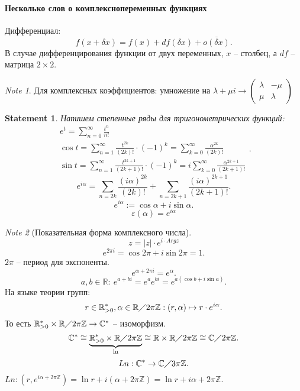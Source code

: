 \documentclass[11pt]{book}
\newcommand{\Z}{\mathbb{Z}}
\newcommand{\R}{\mathbb{R}}
\newcommand{\Cm}{\mathbb{C}}
\newcommand{\slim}{\sum\limits}
\theoremstyle{definition}
\theoremstyle{plain}
\theoremstyle{plain}
\newtheorem*{st}{Statement}
\theoremstyle{definition}
\theoremstyle{remark}
\newtheorem*{note}{Note}
\begin{document}
\paragraph{Несколько слов о комплекснопеременных функциях}
\begin{defn}
    Дифференциал: \[
	f(x + \delta  x) = f(x) + df( \delta  x) + \overline{o( \delta  x)}
    .\] 
    В случае дифференцирования функции от двух переменных, $x$ -- столбец, а $df$ -- матрица $2 \times 2$.
\end{defn}
\begin{note}
    Для комплексных коэффициентов:
    умножение на $\lambda + \mu i \to  
    \left (
    \begin{array}{cc}
	\lambda & - \mu \\
	\mu & \lambda
    \end{array}
\right )
    $ 
\end{note}
\begin{st}
    Напишем степенные ряды для тригонометрических функций:
    \[
	\begin{array}{l}
	    e^{t} = \slim_{n=0}^{\infty} \frac{t ^{n}}{n!}\\
	    \cos t = \slim_{n=1}^{ \infty} \frac{t ^{2k}}{(2k)!} \cdot (-1)^{k} = \slim_{k=0}^{\infty} \frac{ \alpha ^{2k}}{(2k)!}\\
	    \sin t = \slim_{n=1}^{ \infty} \frac{t ^{2k+1}}{(2k+1)!} \cdot (-1)^{k} = i\slim_{k=0}^{\infty} \frac{ \alpha ^{2k+1}}{(2k+1)!}
    \end{array} 
    .\] 
    \[
	e ^{i \alpha} = \slim_{n= 2k} \frac{(i\alpha)^{2k}}{(2k)!} + \slim_{n= 2k+1}\frac{(i \alpha )^{2k+1}}{(2k+1)!} %
    .\] 
    \[
    e ^{i \alpha} := \cos \alpha + i \sin \alpha 
    .\] 
    $$ \varepsilon  ( \alpha ) = e ^{i \alpha }$$
\end{st}
\begin{note}[Показательная форма комплексного числа]
    $$z = |z| \cdot e ^{i \cdot Arg z}$$
    \[
    e^{2\pi i} = \cos 2\pi + i \sin 2\pi = 1
    .\] 
    $2
    \pi$ -- период для экспоненты.
    \[
    e ^{\alpha + 2\pi i} = e^{ \alpha }
    .\] 
    \[
	a, b \in  \R: ~ e^{a + bi} = e ^{ a} e ^{bi} = e^{a ( \cos b + i \sin a)}    
    .\] 
    На языке теории групп:
    \[
	r \in  \R^{*}_{>0} , \alpha  \in  \R\diagup 2 \pi \Z: (r, \alpha ) \mapsto r \cdot e ^{i \alpha} 
    .\] 
    То есть  $\R^{*}_{>0} \times  \R\diagup 2\pi\Z \to  \Cm ^{*}$ -- изоморфизм.
    \[
	\Cm^{*} \cong \underbrace{\R^{*}_{>0} \times  \R\diagup 2\pi\Z}_{\ln} \cong \R \times  \R\diagup 2\pi \Z \cong \Cm\diagup 2\pi\Z
    .\] 
    \[
    Ln: \Cm^{*} \to  \Cm\diagup 3\pi\Z
    .\] 
    $Ln: (r, e^{i\alpha + 2\pi\Z}) = \ln r + i (\alpha + 2\pi\Z)= \ln r + i \alpha  + 2\pi\Z$.
\end{note}
\end{document}
